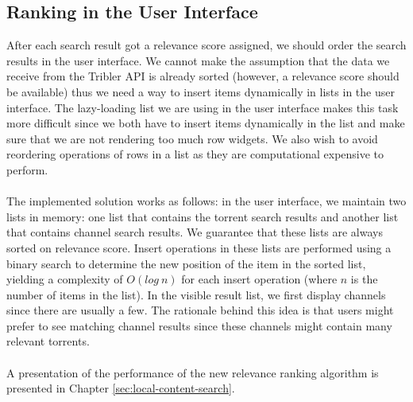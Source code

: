 \subsection{Ranking in the User Interface}
After each search result got a relevance score assigned, we should order the search results in the user interface. We cannot make the assumption that the data we receive from the Tribler API is already sorted (however, a relevance score should be available) thus we need a way to insert items dynamically in lists in the user interface. The lazy-loading list we are using in the user interface makes this task more difficult since we both have to insert items dynamically in the list and make sure that we are not rendering too much row widgets. We also wish to avoid reordering operations of rows in a list as they are computational expensive to perform.\\\\
The implemented solution works as follows: in the user interface, we maintain two lists in memory: one list that contains the torrent search results and another list that contains channel search results. We guarantee that these lists are always sorted on relevance score. Insert operations in these lists are performed using a binary search to determine the new position of the item in the sorted list, yielding a complexity of $ O(log\ n) $ for each insert operation (where $ n $ is the number of items in the list). In the visible result list, we first display channels since there are usually a few. The rationale behind this idea is that users might prefer to see matching channel results since these channels might contain many relevant torrents.\\\\
A presentation of the performance of the new relevance ranking algorithm is presented in Chapter \ref{sec:local-content-search}.

